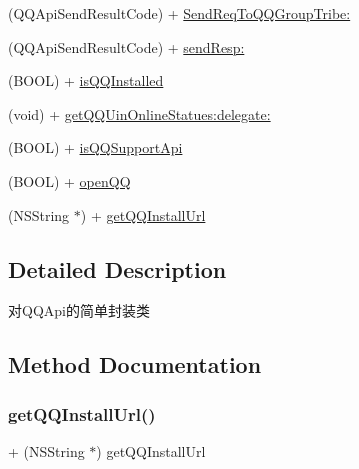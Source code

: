 \begin{DoxyCompactItemize}
(Q\+Q\+Api\+Send\+Result\+Code) + \mbox{\hyperlink{interface_q_q_api_interface_a7f4a0e2ff82a3d9ca0ccb8a28ed68dd6}{Send\+Req\+To\+Q\+Q\+Group\+Tribe\+:}}
\item 
(Q\+Q\+Api\+Send\+Result\+Code) + \mbox{\hyperlink{interface_q_q_api_interface_aac1f1046d586eadaebc8d21b2b8041cd}{send\+Resp\+:}}
\item 
(B\+O\+OL) + \mbox{\hyperlink{interface_q_q_api_interface_a3cce7811084fbe0fac86a61068a5bb8f}{is\+Q\+Q\+Installed}}
\item 
(void) + \mbox{\hyperlink{interface_q_q_api_interface_ae77e4e9dd1328f58048144afe625cfbf}{get\+Q\+Q\+Uin\+Online\+Statues\+:delegate\+:}}
\item 
(B\+O\+OL) + \mbox{\hyperlink{interface_q_q_api_interface_a3669fca9c3a1df5991416dc3a5a719c4}{is\+Q\+Q\+Support\+Api}}
\item 
(B\+O\+OL) + \mbox{\hyperlink{interface_q_q_api_interface_a3464302bc808ef7b69f82129820f0696}{open\+QQ}}
\item 
(N\+S\+String $\ast$) + \mbox{\hyperlink{interface_q_q_api_interface_a6cbc694efeaefe36335c9ac89e575ff4}{get\+Q\+Q\+Install\+Url}}
\end{DoxyCompactItemize}


\subsection{Detailed Description}
对\+Q\+Q\+Api的简单封装类 

\subsection{Method Documentation}
\mbox{\label{interface_q_q_api_interface_a6cbc694efeaefe36335c9ac89e575ff4}} 
\subsubsection{\texorpdfstring{get\+Q\+Q\+Install\+Url()}{getQQInstallUrl()}\hspace{0.1cm}{\footnotesize\ttfamily [1/2]}}
{\footnotesize\ttfamily + (N\+S\+String $\ast$) get\+Q\+Q\+Install\+Url \begin{DoxyParamCaption}{ }\end{DoxyParamCaption}}

